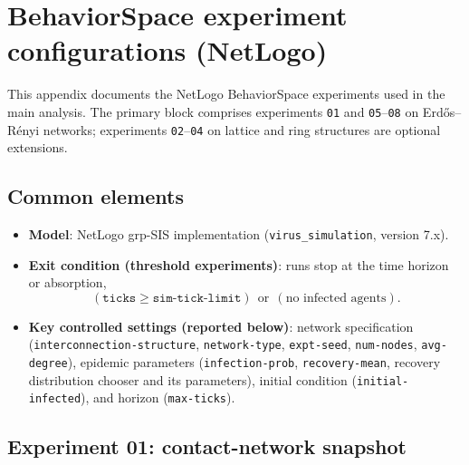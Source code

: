 \documentclass[11pt,a4paper]{article}
\begin{document}
\section{BehaviorSpace experiment configurations (NetLogo)}
\label{app:behaviorspace}

This appendix documents the NetLogo BehaviorSpace experiments used in the main analysis. The primary block comprises experiments \texttt{01} and \texttt{05}--\texttt{08} on Erd\H{o}s--R\'enyi networks; experiments \texttt{02}--\texttt{04} on lattice and ring structures are optional extensions.

\sloppy

\subsection{Common elements}
\begin{itemize}[leftmargin=*]
  \item \textbf{Model}: NetLogo grp-SIS implementation (\texttt{virus\_simulation}, version 7.x).
  \item \textbf{Exit condition (threshold experiments)}: runs stop at the time horizon or absorption,
  \[
    (\texttt{ticks} \ge \texttt{sim-tick-limit}) \ \ \text{or}\ \ (\text{no infected agents}).
  \]
  \item \textbf{Key controlled settings (reported below)}: network specification (\texttt{interconnection-structure}, \texttt{network-type}, \texttt{expt-seed}, \texttt{num-nodes}, \texttt{avg-degree}), epidemic parameters (\texttt{infection-prob}, \texttt{recovery-mean}, recovery distribution chooser and its parameters), initial condition (\texttt{initial-infected}), and horizon (\texttt{max-ticks}).
\end{itemize}

\subsection{Experiment 01: contact-network snapshot}
\end{document}
